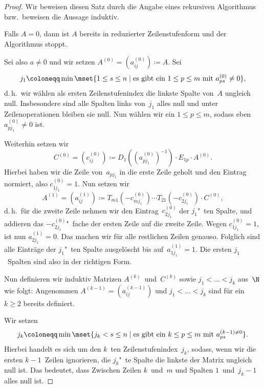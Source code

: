 \documentclass[a4paper]{article}
\begin{document}
\begin{proof}
    Wir beweisen diesen Satz durch die Angabe eines rekursiven Algorithmus bzw.\ beweisen die Aussage induktiv.

    Falls $A = 0$, dann ist $A$ bereits in reduzierter Zeilenstufenform und der Algorithmus stoppt.

    Sei also $a \neq 0$ und wir setzen $A^{(0)} = (a_{ij}^{(0)}) \coloneqq A$. Sei
    \begin{equation*}
        j_1 \coloneqq \min\mset{1 \leq s \leq n \mid \text{es gibt ein } 1 \leq p \leq m \text{ mit } a_{ps}^{(0)} \neq 0},
    \end{equation*}
    d.\,h.\ wir wählen als ersten Zeilenstufenindex die linkste Spalte von~$A$ ungleich null. Insbesondere sind alle Spalten links von~$j_1$ alles null und unter Zeilenoperationen bleiben sie null. Nun wählen wir ein $1 \leq p \leq m$, sodass eben $a_{pj_1}^{(0)} \neq 0$ ist.

    Weiterhin setzen wir
    \begin{equation*}
        C^{(0)} = (c_{ij}^{(0)}) \coloneqq D_1((a_{pj_1}^{(0)})^{-1}) \cdot E_{1p} \cdot A^{(0)}.
    \end{equation*}
    Hierbei haben wir die Zeile von~$a_{pj_1}$ in die erste Zeile geholt und den Eintrag normiert, also $c_{1j_1}^{(0)} = 1$. Nun setzen wir
    \begin{equation*}
        A^{(1)} = (a_{ij}^{(1)}) \coloneqq T_{m1}(-c_{mj_1}^{(0)}) \cdots T_{21}(-c_{2j_1}^{(0)}) \cdot C^{(0)},
    \end{equation*}
    d.\,h.\ für die zweite Zeile nehmen wir den Eintrag~$c_{2j_1}^{(0)}$ der $j_1$"~ten Spalte, und addieren das $-c_{2j_1}^{(0)}$"~fache der ersten Zeile auf die zweite Zeile. Wegen $c_{1j_1}^{(0)} = 1$, ist nun $a_{2j_1}^{(1)} = 0$. Das machen wir für alle restlichen Zeilen genauso. Folglich sind alle Einträge der $j_1$"~ten Spalte ausgelöscht bis auf~$a_{1j_1}^{(1)} = 1$. Die ersten $j_1$~Spalten sind also in der richtigen Form.

    Nun definieren wir induktiv Matrizen $A^{(k)}$~und~$C^{(k)}$ sowie $j_1 < \dots < j_k$ aus~$\N$ wie folgt: Angenommen $A^{(k-1)} = (a_{ij}^{(k-1)})$ und $j_1 < \dots < j_k$ sind für ein~$k \geq 2$ bereits definiert.

    Wir setzen
    \begin{equation*}
        j_k \coloneqq \min\mset{j_k < s \leq n \mid \text{es gibt ein } k \leq p \leq m \text{ mit } a_{ps}^{(k-1) \neq 0}}.
    \end{equation*}
    Hierbei handelt es sich um den $k$~ten Zeilenstufenindex~$j_k$, sodass, wenn wir die ersten $k-1$~Zeilen ignorieren, die $j_k$"~te Spalte die linkste der Matrix ungleich null ist. Das bedeutet, dass Zwischen Zeilen $k$~und~$m$ und Spalten $1$~und~$j_k-1$ alles null ist.


\end{proof}
\end{document}
